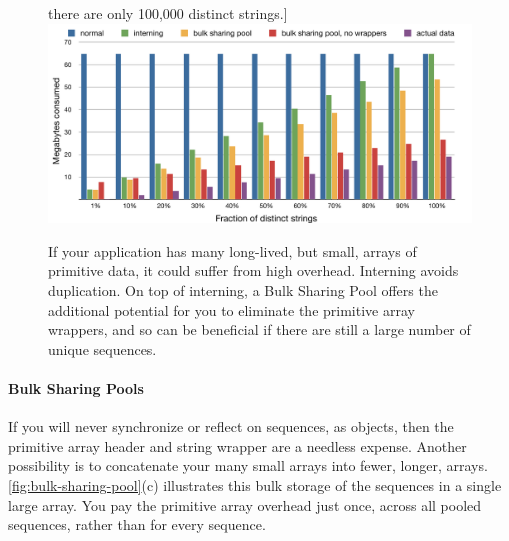 \begin{figure}
	there are only 100,000 distinct strings.]{\includegraphics[width=\textwidth]{part3/Figures/extreme/bulksharingpool_consumptionchart.pdf}}
	\caption{If your application has many long-lived, but small, arrays of
	primitive data, it could suffer from high overhead. Interning avoids
	duplication. On top of interning, a Bulk Sharing Pool offers the additional
	potential for you to eliminate the primitive array wrappers, and so can be
	beneficial if there are still a large number of unique sequences.}
	\label{fig:bulk-sharing-pool}
\end{figure}

\paragraph{Bulk Sharing Pools}

If you will never synchronize or reflect on sequences, as objects, then the
primitive array header and string wrapper are a needless expense. Another
possibility is to concatenate your many small arrays into fewer, longer, arrays.
\autoref{fig:bulk-sharing-pool}(c) illustrates this bulk storage of the
sequences in a single large array. You pay the primitive array overhead just
once, across all pooled sequences, rather than for every sequence.

